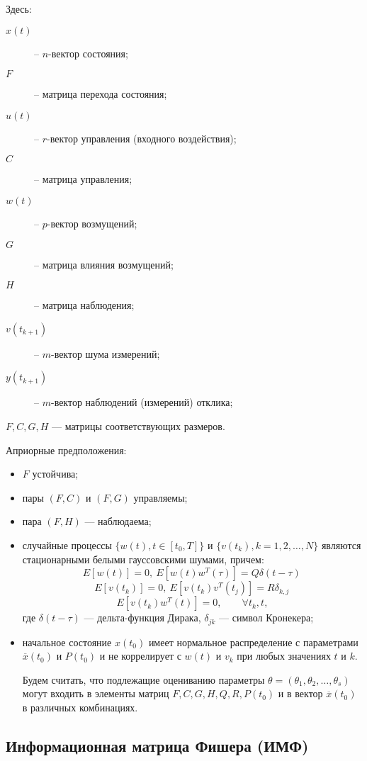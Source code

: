 \documentclass[a4paper,14pt]{extarticle}
\renewcommand{\vec}[1]{#1}
\begin{document}
Здесь:
\begin{description}
  \item [$\vec{x}(t)$] -- $n$-вектор состояния;
  \item [$F$] -- матрица перехода состояния;
  \item [$\vec{u}(t)$] -- $r$-вектор управления (входного воздействия);
  \item [$C$] -- матрица управления;
  \item [$\vec{w}(t)$] -- $p$-вектор возмущений;
  \item [$G$] -- матрица влияния возмущений;
  \item [$H$] -- матрица наблюдения;
  \item [$\vec{v}(t_{k+1})$] -- $m$-вектор шума измерений;
  \item [$\vec{y}(t_{k+1})$] -- $m$-вектор наблюдений (измерений) отклика;
\end{description}

$F, C, G, H$ --- матрицы соответствующих размеров.

\bigskip
Априорные предположения:
\begin{itemize}
\item $F$ устойчива;
\item пары $(F, C)$ и $(F, G)$ управляемы;
\item пара $(F, H)$ --- наблюдаема;
\item случайные процессы $\{\vec{w}(t), t \in [t_0, T]\}$ и
	$\{\vec{v}(t_{k}), k = 1, 2, \ldots, N\}$ являются стационарными белыми
		гауссовскими шумами, причем:
\[
	E[\vec{w}(t)] = 0,\ E[\vec{w}(t)\vec{w}^{T}(\tau)] = Q \delta(t-\tau)\,
\]
\[
	E[\vec{v}(t_k)] = 0,\ E[\vec{v}(t_k)\vec{v}^{T}(t_j)] = R \delta_{k,j}\,
\]
\[
	E[\vec{v}(t_k)\vec{w}^{T}(t)] = 0,\qquad \forall t_k, t,
\]
		где $\delta(t-\tau)$ --- дельта-функция Дирака, $\delta_{jk}$ --- символ
		Кронекера;

\item начальное состояние $\vec{x}(t_0)$ имеет нормальное распределение с
параметрами $\overline{\vec{x}}(t_0)$ и $P(t_0)$ и не коррелирует с
		$\vec{w(t)}$ и $\vec{v_k}$ при любых значениях $t$ и $k$.

Будем считать, что подлежащие оцениванию параметры $\theta = (\theta_1,
\theta_2, \ldots, \theta_s)$ могут входить в элементы матриц $F, C, G, H, Q, R,
P(t_0)$ и в вектор $\overline{\vec{x}}(t_0)$ в различных комбинациях.

\end{itemize}

\subsection{Информационная матрица Фишера (ИМФ)}
\end{document}

